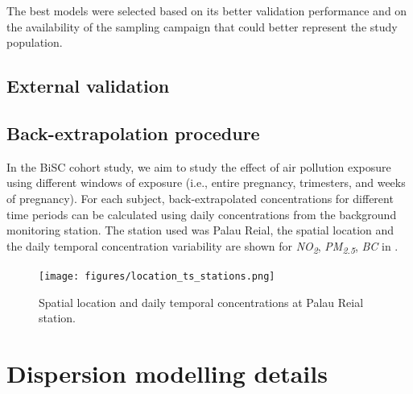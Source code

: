\documentclass{article}
\begin{document}
The best models were selected based on its better validation performance and on the availability of the sampling campaign that could better represent the study population. 

\subsection{External validation}



\newpage
\subsection{Back-extrapolation procedure}

In the BiSC cohort study, we aim to study the effect of air pollution exposure using different windows of exposure (i.e., entire pregnancy, trimesters, and weeks of pregnancy). For each subject, back-extrapolated concentrations for different time periods can be calculated using daily concentrations from the background monitoring station. The station used was Palau Reial, the spatial location and the daily temporal concentration variability are shown for \textit{NO\textsubscript{2}}, \textit{PM\textsubscript{2.5}}, \textit{BC} in \textbf{}.


\renewcommand{\thefigure}{S\arabic{figure}}

\captionsetup[figure]{skip=6pt} %
\begin{figure}[!htb]
    \centering
    \texttt{[image: figures/location\_ts\_stations.png]} %
    \caption{Spatial location and daily temporal concentrations at Palau Reial station.}
    \label{FigureS1} %
\end{figure}



\newpage


\section{Dispersion modelling details}
\end{document}
